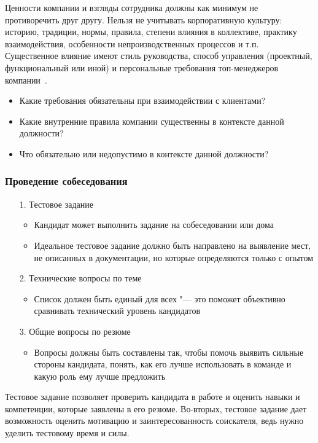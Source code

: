 \documentclass{../industrial-development}
\begin{document}
	Ценности компании и взгляды сотрудника должны как минимум не противоречить друг другу. Нельзя не учитывать корпоративную культуру: историю, традиции, нормы, правила, степени влияния в коллективе, практику взаимодействия, особенности непроизводственных процессов и т.п. Существенное влияние имеют стиль руководства, способ управления (проектный, функциональный или иной) и персональные требования топ-менеджеров компании~\cite[с.~280]{Pererva}.
	\begin{itemize}
		\item	Какие требования обязательны при взаимодействии с клиентами?
		\item	Какие внутренние правила компании существенны в контексте данной должности?
		\item	Что обязательно или недопустимо в контексте данной должности?
	\end{itemize}
	
	\begin{frame} \frametitle{Проведение собеседования}
		
		\begin{itemize}
			\item[1.] Тестовое задание
			\begin{itemize}
				\item Кандидат может выполнить задание на собеседовании или дома
				\item Идеальное тестовое задание должно быть направлено на выявление мест, не описанных в документации, но которые определяются только с опытом
			\end{itemize}
			\item[2.] Технические вопросы по теме
			\begin{itemize}
				\item Список должен быть единый для всех "--- это поможет объективно сравнивать технический уровень кандидатов
			\end{itemize}
			\item[3.] Общие вопросы по резюме
			\begin{itemize}
				\item Вопросы должны быть составлены так, чтобы помочь выявить сильные стороны кандидата, понять, как его лучше использовать в команде и какую роль ему лучше предложить
			\end{itemize}
		\end{itemize}
	\end{frame}
	
	\lecturenotes
	
	Тестовое задание позволяет проверить кандидата в работе и оценить навыки и компетенции, которые заявлены в его резюме. Во-вторых, тестовое задание дает возможность оценить мотивацию и заинтересованность соискателя, ведь нужно уделить тестовому время и силы.
	
\end{document}
